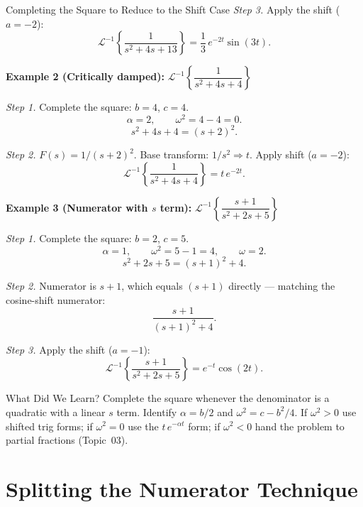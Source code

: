 \documentclass[12pt,a4paper]{article}
\begin{document}
\begin{infobox}{Completing the Square to Reduce to the Shift Case}
\textit{Step 3.} Apply the shift ($a = -2$):
\[
  \mathcal{L}^{-1}\left\{\frac{1}{s^2+4s+13}\right\} = \frac{1}{3}\,e^{-2t}\sin(3t).
\]

\medskip
\textbf{Example 2 (Critically damped):} $\mathcal{L}^{-1}\left\{\dfrac{1}{s^2+4s+4}\right\}$

\textit{Step 1.} Complete the square: $b=4$, $c=4$.
\[
  \alpha = 2, \qquad \omega^2 = 4 - 4 = 0.
\]
\[
  s^2+4s+4 = (s+2)^2.
\]

\textit{Step 2.} $F(s) = 1/(s+2)^2$. Base transform: $1/s^2 \Rightarrow t$.
Apply shift ($a = -2$):
\[
  \mathcal{L}^{-1}\left\{\frac{1}{s^2+4s+4}\right\} = t\,e^{-2t}.
\]

\medskip
\textbf{Example 3 (Numerator with $s$ term):}
$\mathcal{L}^{-1}\left\{\dfrac{s+1}{s^2+2s+5}\right\}$

\textit{Step 1.} Complete the square: $b=2$, $c=5$.
\[
  \alpha = 1, \qquad \omega^2 = 5 - 1 = 4, \qquad \omega = 2.
\]
\[
  s^2+2s+5 = (s+1)^2+4.
\]

\textit{Step 2.} Numerator is $s+1$, which equals $(s+1)$ directly --- matching the
cosine-shift numerator:
\[
  \frac{s+1}{(s+1)^2+4}.
\]

\textit{Step 3.} Apply the shift ($a = -1$):
\[
  \mathcal{L}^{-1}\left\{\frac{s+1}{s^2+2s+5}\right\} = e^{-t}\cos(2t).
\]
\end{infobox}

\begin{learnbox}{What Did We Learn?}
Complete the square whenever the denominator is a quadratic with a linear $s$ term.
Identify $\alpha = b/2$ and $\omega^2 = c - b^2/4$. If $\omega^2 > 0$ use shifted
trig forms; if $\omega^2 = 0$ use the $t\,e^{-\alpha t}$ form; if $\omega^2 < 0$
hand the problem to partial fractions (Topic~03).
\end{learnbox}

\section{Splitting the Numerator Technique}
\end{document}
